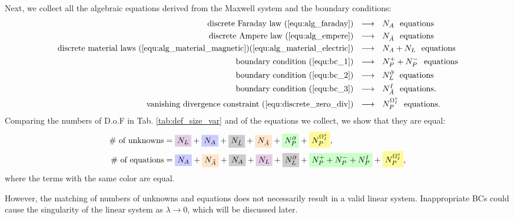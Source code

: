 \documentclass{article}
\begin{document}
Next, we collect all the algebraic equations derived from the Maxwell system and the boundary conditions: 
\begin{align*}
    \text{discrete Faraday law (\ref{equ:alg_faraday})} \ \ &\longrightarrow\ \  N_A \ \ \text{equations} \\
    \text{discrete Ampere law (\ref{equ:alg_empere})} \ \ &\longrightarrow\ \  N_{\Tilde{A}} \ \ \text{equations} \\
    \text{discrete material laws (\ref{equ:alg_material_magnetic})(\ref{equ:alg_material_electric})} \ \ &\longrightarrow\ \  N_A + N_L \ \ \text{equations} \\
    \text{boundary condition (\ref{equ:bc_1})} \ \ &\longrightarrow\ \  N_P^+ + N_P^- \ \ \text{equations} \\
    \text{boundary condition (\ref{equ:bc_2})} \ \ &\longrightarrow\ \  N_L^\partial \ \ \text{equations} \\
    \text{boundary condition (\ref{equ:bc_3})} \ \ &\longrightarrow\ \  N_{\Tilde{A}}^I \ \ \text{equations}. \\
    \text{vanishing divergence constraint (\ref{equ:discrete_zero_div})} \ \ &\longrightarrow\ \  N_P^{\Omega^\circ_I} \ \ \text{equations}. \\
\end{align*}
Comparing the numbers of D.o.F in Tab. \ref{tab:def_size_var} and of the equations we collect, we show that they are equal:
\begin{align*}
    \#\text{ of unknowns} &= \colorbox{violet!20}{$N_L$} + \colorbox{blue!20}{$N_A$} + \colorbox{gray!40}{$N_{\Tilde{L}}$} + \colorbox{orange!20}{$N_{\Tilde{A}}$} + \colorbox{green!20}{$N_P^\partial$} + \colorbox{yellow!40}{$N_P^{\Omega^\circ_I}$}, \\
    \#\text{ of equations} &= \colorbox{blue!20}{$N_A$} + \colorbox{orange!20}{$N_{\Tilde{A}}$} + \colorbox{gray!40}{$N_A$} + \colorbox{violet!20}{$N_L$} + \colorbox{gray!40}{$N_L^\partial$} + \colorbox{green!20}{$N_P^+ + N_P^- + N_P^I$}+ \colorbox{yellow!40}{$N_P^{\Omega^\circ_I}$},
\end{align*}
where the terms with the same color are equal.

However, the matching of numbers of unknowns and equations does not necessarily result in a valid linear system. Inappropriate BCs could cause the singularity of the linear system as $\lambda \rightarrow 0$, which will be discussed later. 
\end{document}
